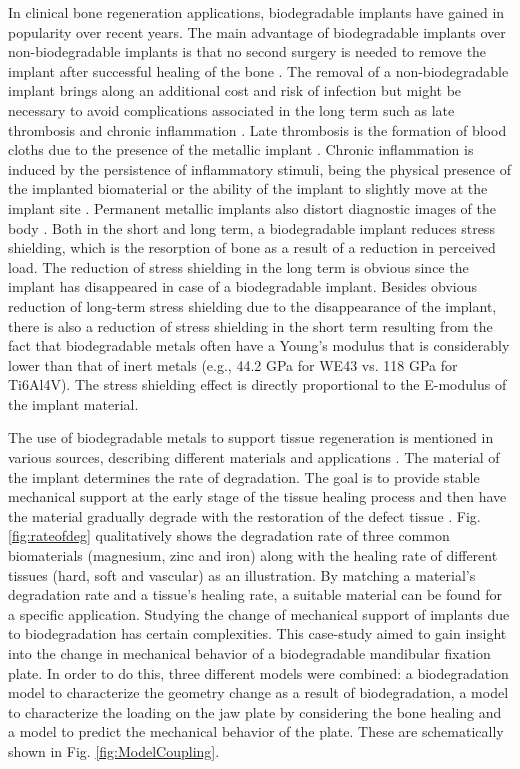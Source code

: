 In clinical bone regeneration applications, biodegradable implants have gained in popularity over recent years. The main advantage of biodegradable implants over non-biodegradable implants is that no second surgery is needed to remove the implant after successful healing of the bone \cite{Zheng2014}. The removal of a non-biodegradable implant brings along an additional cost and risk of infection but might be necessary to avoid complications associated in the long term such as late thrombosis and chronic inflammation \cite{KChen}. Late thrombosis is the formation of blood cloths due to the presence of the metallic implant \cite{thrombosis}. Chronic inflammation is induced by the persistence of inflammatory stimuli, being the physical presence of the implanted biomaterial or the ability of the implant to slightly move at the implant site \cite{inflammation}. Permanent metallic implants also distort diagnostic images of the body \cite{Han}. Both in the short and long term, a biodegradable implant reduces stress shielding, which is the resorption of bone as a result of a reduction in perceived load. The reduction of stress shielding in the long term is obvious since the implant has disappeared in case of a biodegradable implant. Besides obvious reduction of long-term stress shielding due to the disappearance of the implant, there is also a reduction of stress shielding in the short term resulting from the fact that biodegradable metals often have a Young's modulus that is considerably lower than that of inert metals (e.g., 44.2 GPa for WE43 vs. 118 GPa for Ti6Al4V). The stress shielding effect is directly proportional to the E-modulus of the implant material.

The use of biodegradable metals to support tissue regeneration is mentioned in various sources, describing different materials and applications \cite{KChen,JChen,Yang}. The material of the implant determines the rate of degradation. The goal is to provide stable mechanical support at the early stage of the tissue healing process and then have the material gradually degrade with the restoration of the defect tissue \cite{Yang}. Fig. \ref{fig:rateofdeg} qualitatively shows the degradation rate of three common biomaterials (magnesium, zinc and iron) along with the healing rate of different tissues (hard, soft and vascular) as an illustration. By matching a material's degradation rate and a tissue's healing rate, a suitable material can be found for a specific application. Studying the change of mechanical support of implants due to biodegradation has certain complexities. This case-study aimed to gain insight into the change in mechanical behavior of a biodegradable mandibular fixation plate. In order to do this, three different models were combined: a biodegradation model to characterize the geometry change as a result of biodegradation, a model to characterize the loading on the jaw plate by considering the bone healing and a model to predict the mechanical behavior of the plate. These are schematically shown in Fig. \ref{fig:ModelCoupling}.

